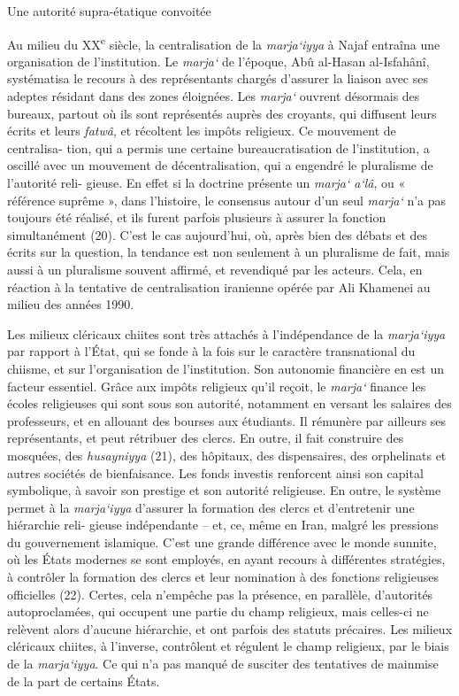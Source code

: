 Une autorité supra-étatique convoitée

Au milieu du XX\textsuperscript{e} siècle, la centralisation de la
\emph{marja`iyya} à Najaf entraîna une organisation de l'institution. Le
\emph{marja`} de l'époque, Abû al-Hasan al-Isfahânî, systématisa le
recours à des représentants chargés d'assurer la liaison avec ses
adeptes résidant dans des zones éloignées. Les \emph{marja`} ouvrent
désormais des bureaux, partout où ils sont représentés auprès des
croyants, qui diffusent leurs écrits et leurs \emph{fatwâ}, et récoltent
les impôts religieux. Ce mouvement de centralisa- tion, qui a permis une
certaine bureaucratisation de l'institution, a oscillé avec un mouvement
de décentralisation, qui a engendré le pluralisme de l'autorité reli-
gieuse. En effet si la doctrine présente un \emph{marja` a`lâ}, ou «
référence suprême », dans l'histoire, le consensus autour d'un seul
\emph{marja`} n'a pas toujours été réalisé, et ils furent parfois
plusieurs à assurer la fonction simultanément (20). C'est le cas
aujourd'hui, où, après bien des débats et des écrits sur la question, la
tendance est non seulement à un pluralisme de fait, mais aussi à un
pluralisme souvent affirmé, et revendiqué par les acteurs. Cela, en
réaction à la tentative de centralisation iranienne opérée par Ali
Khamenei au milieu des années 1990.

Les milieux cléricaux chiites sont très attachés à l'indépendance de la
\emph{marja`iyya} par rapport à l'État, qui se fonde à la fois sur le
caractère transnational du chiisme, et sur l'organisation de
l'institution. Son autonomie financière en est un facteur essentiel.
Grâce aux impôts religieux qu'il reçoit, le \emph{marja`} finance les
écoles religieuses qui sont sous son autorité, notamment en versant les
salaires des professeurs, et en allouant des bourses aux étudiants. Il
rémunère par ailleurs ses représentants, et peut rétribuer des clercs.
En outre, il fait construire des mosquées, des \emph{husayniyya} (21),
des hôpitaux, des dispensaires, des orphelinats et autres sociétés de
bienfaisance. Les fonds investis renforcent ainsi son capital
symbolique, à savoir son prestige et son autorité religieuse. En outre,
le système permet à la \emph{marja`iyya} d'assurer la formation des
clercs et d'entretenir une hiérarchie reli- gieuse indépendante -- et,
ce, même en Iran, malgré les pressions du gouvernement islamique. C'est
une grande différence avec le monde sunnite, où les États modernes se
sont employés, en ayant recours à différentes stratégies, à contrôler la
formation des clercs et leur nomination à des fonctions religieuses
officielles (22). Certes, cela n'empêche pas la présence, en parallèle,
d'autorités autoproclamées, qui occupent une partie du champ religieux,
mais celles-ci ne relèvent alors d'aucune hiérarchie, et ont parfois des
statuts précaires. Les milieux cléricaux chiites, à l'inverse,
contrôlent et régulent le champ religieux, par le biais de la
\emph{marja`iyya}. Ce qui n'a pas manqué de susciter des tentatives de
mainmise de la part de certains États.

